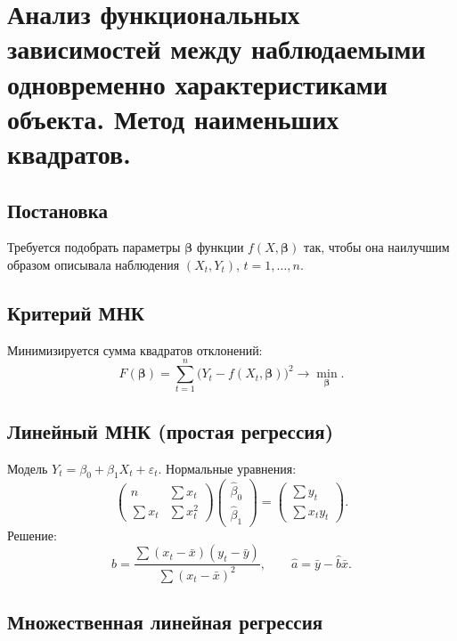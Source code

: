 \section{Анализ функциональных зависимостей между наблюдаемыми одновременно характеристиками объекта. Метод наименьших квадратов.}

\subsection*{Постановка}

Требуется подобрать параметры $\boldsymbol{\beta}$ функции $f(X,\boldsymbol{\beta})$ так, чтобы она наилучшим образом описывала наблюдения $(X_t, Y_t)$, $t=1,\ldots,n$.

\subsection*{Критерий МНК}

Минимизируется сумма квадратов отклонений:
\[
  F(\boldsymbol{\beta}) = \sum_{t=1}^{n} \bigl(Y_t - f(X_t,\boldsymbol{\beta})\bigr)^2 \to \min_{\boldsymbol{\beta}}.
\]

\subsection*{Линейный МНК (простая регрессия)}

Модель $Y_t = \beta_0 + \beta_1 X_t + \varepsilon_t$. Нормальные уравнения:
\[
  \begin{pmatrix} n & \sum x_t \\ \sum x_t & \sum x_t^2 \end{pmatrix}
  \begin{pmatrix} \hat{\beta}_0 \\ \hat{\beta}_1 \end{pmatrix}
  = \begin{pmatrix} \sum y_t \\ \sum x_t y_t \end{pmatrix}.
\]
Решение:
\[
  \hat{b} = \frac{\sum(x_t-\bar{x})(y_t-\bar{y})}{\sum(x_t-\bar{x})^2}, \qquad \hat{a} = \bar{y} - \hat{b}\bar{x}.
\]

\subsection*{Множественная линейная регрессия}

